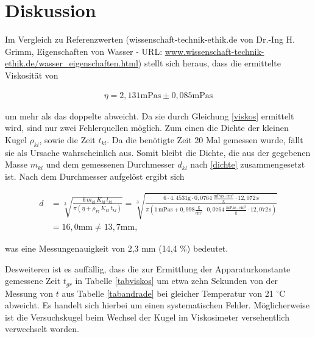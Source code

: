\section{Diskussion}
Im Vergleich zu Referenzwerten ({wissenschaft-technik-ethik.de von Dr.-Ing H. Grimm, Eigenschaften von Wasser - URL: \href{http://www.wissenschaft-technik-ethik.de/wasser_eigenschaften.html#kap06}{www.wissenschaft-technik-ethik.de/wasser\_eigenschaften.html}})
stellt sich heraus, dass die ermittelte Viskosität von 

\begin{align*}
 \eta = 2,131 \text{mPas} \pm 0,085 \text{mPas}
\end{align*}

um mehr als das doppelte abweicht. Da sie durch Gleichung \eqref{viskos} ermittelt wird, sind nur zwei Fehlerquellen möglich. Zum einen
die Dichte der kleinen Kugel $\rho_{kl}$, sowie die Zeit $t_{kl}$. Da die benötigte Zeit 20 Mal gemessen wurde, fällt sie als Ursache
wahrscheinlich aus. Somit bleibt die Dichte, die aus der gegebenen Masse $m_{kl}$ und dem gemessenen Durchmesser $d_{kl}$ nach \eqref{dichte}
zusammengesetzt ist. Nach dem Durchmesser aufgelöst ergibt sich

\begin{align}
  \nonumber
  d &= \sqrt[3]{\frac{6\, m_{kl} \, K_{kl} \, t_{kl} }{\pi \left(\eta + \rho_{Fl} \, K_{kl} \, t_{kl}\right)}} = \sqrt[3]{\frac{6\cdot 4,4531 \text{g} \cdot 0,0764 \,\frac{\text{mPas}\cdot \text{cm}^3}{\text{g}} \cdot 12,072 \,\text{s} }{\pi \left(1\,\text{mPas} + 0,998  \frac{\text{g}}{\text{cm}^3} \cdot 0,0764 \,\frac{\text{mPas}\cdot \text{cm}^3}{\text{g}} \cdot 12,072 \,\text{s}\right)}}\\
  &= 16,0 \text{mm} \neq 13,7 \text{mm},
\end{align}

was eine Messungenauigkeit von 2,3 mm (14,4 \%) bedeutet.

Desweiteren ist es auffällig, dass die zur Ermittlung der Apparaturkonstante gemessene Zeit $t_{gr}$ in Tabelle \ref{tabviskos} um etwa zehn 
Sekunden von der Messung von $t$ aus Tabelle \ref{tabandrade} bei gleicher Temperatur von 21 $^\circ$C abweicht. 
Es handelt sich hierbei um einen systematischen Fehler. Möglicherweise ist die Versuchskugel beim Wechsel der Kugel im Viskosimeter 
versehentlich verwechselt worden.






